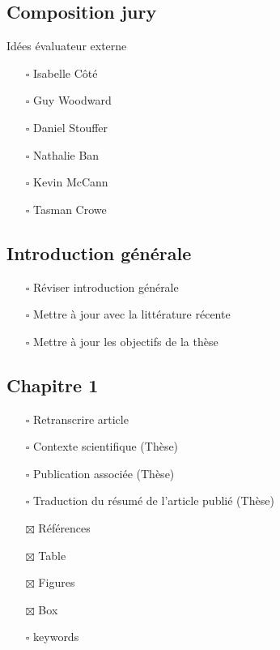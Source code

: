 \hypertarget{composition-jury}{%
\subsection{Composition jury}\label{composition-jury}}

Idées évaluateur externe

\begin{itemize}
\tightlist
\item[$\square$]
  Isabelle Côté
\item[$\square$]
  Guy Woodward
\item[$\square$]
  Daniel Stouffer
\item[$\square$]
  Nathalie Ban
\item[$\square$]
  Kevin McCann
\item[$\square$]
  Tasman Crowe
\end{itemize}

\hypertarget{introduction-guxe9nuxe9rale}{%
\subsection{Introduction générale}\label{introduction-guxe9nuxe9rale}}

\begin{itemize}
\tightlist
\item[$\square$]
  Réviser introduction générale
\item[$\square$]
  Mettre à jour avec la littérature récente
\item[$\square$]
  Mettre à jour les objectifs de la thèse
\end{itemize}

\hypertarget{chapitre-1}{%
\subsection{Chapitre 1}\label{chapitre-1}}

\begin{itemize}
\tightlist
\item[$\square$]
  Retranscrire article
\item[$\square$]
  Contexte scientifique (Thèse)
\item[$\square$]
  Publication associée (Thèse)
\item[$\square$]
  Traduction du résumé de l'article publié (Thèse)
\item[$\boxtimes$]
  Références
\item[$\boxtimes$]
  Table
\item[$\boxtimes$]
  Figures
\item[$\boxtimes$]
  Box
\item[$\square$]
  keywords
\end{itemize}

